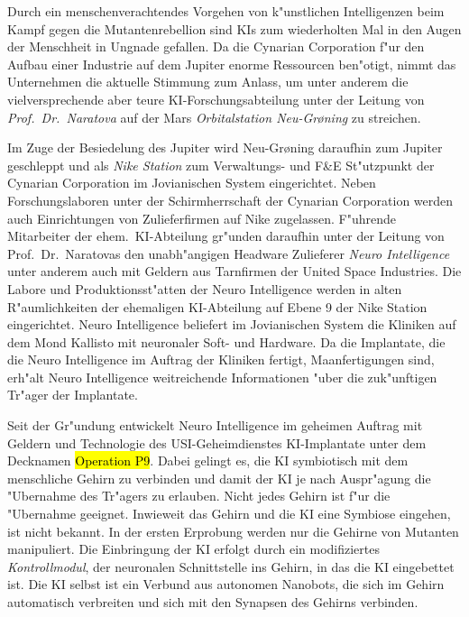 

Durch ein menschenverachtendes Vorgehen von k"unstlichen Intelligenzen beim Kampf gegen die Mutantenrebellion sind KIs zum wiederholten Mal in den Augen der Menschheit in Ungnade gefallen. Da die Cynarian Corporation f"ur den Aufbau einer Industrie auf dem Jupiter enorme Ressourcen ben"otigt, nimmt das Unternehmen die aktuelle Stimmung zum Anlass, um unter anderem die vielversprechende aber teure KI-Forschungsabteilung unter der Leitung von \emph{Prof.~Dr.~Naratova} auf der Mars \emph{Orbitalstation Neu-Gr{\o}ning} zu streichen.

Im Zuge der Besiedelung des Jupiter wird Neu-Gr{\o}ning daraufhin zum Jupiter geschleppt und als \emph{Nike Station} zum Verwaltungs- und F\&E St"utzpunkt der Cynarian Corporation im Jovianischen System eingerichtet. Neben Forschungslaboren unter der Schirmherrschaft der Cynarian Corporation werden auch Einrichtungen von Zulieferfirmen auf Nike zugelassen. F"uhrende Mitarbeiter der ehem.~KI-Abteilung gr"unden daraufhin unter der Leitung von Prof.~Dr.~Naratovas den unabh"angigen Headware Zulieferer \emph{Neuro Intelligence} unter anderem auch mit Geldern aus Tarnfirmen der United Space Industries. Die Labore und Produktionsst"atten der Neuro Intelligence werden in alten R"aumlichkeiten der ehemaligen KI-Abteilung auf Ebene 9 der Nike Station eingerichtet. Neuro Intelligence beliefert im Jovianischen System die Kliniken auf dem Mond Kallisto mit neuronaler Soft- und Hardware. Da die Implantate, die die Neuro Intelligence im Auftrag der Kliniken fertigt, Ma\3anfertigungen sind, erh"alt Neuro Intelligence weitreichende Informationen "uber die zuk"unftigen Tr"ager der Implantate.

Seit der Gr"undung entwickelt Neuro Intelligence im geheimen Auftrag mit Geldern und Technologie des USI-Geheimdienstes KI-Implantate unter dem Decknamen \hl{Operation P9}. Dabei gelingt es, die KI symbiotisch mit dem menschliche Gehirn zu verbinden und damit der KI je nach Auspr"agung die "Ubernahme des Tr"agers zu erlauben. Nicht jedes Gehirn ist f"ur die "Ubernahme geeignet. Inwieweit das Gehirn und die KI eine Symbiose eingehen, ist nicht bekannt. In der ersten Erprobung werden nur die Gehirne von Mutanten manipuliert. Die Einbringung der KI erfolgt durch ein modifiziertes \emph{Kontrollmodul}, der neuronalen Schnittstelle ins Gehirn, in das die KI eingebettet ist. Die KI selbst ist ein Verbund aus autonomen Nanobots, die sich im Gehirn automatisch verbreiten und sich mit den Synapsen des Gehirns verbinden.

